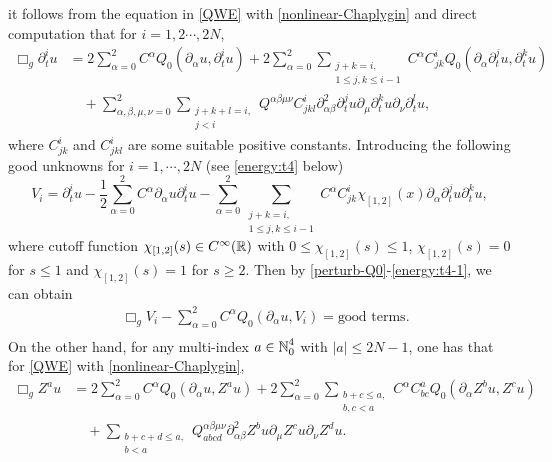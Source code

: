 \documentclass[11pt,twoside]{article}
\def\N{\mathop{\mathbb N\kern 0pt}\nolimits}
\def\R{\mathop{\mathbb R\kern 0pt}\nolimits}
\def\p{\partial}
\theoremstyle{plain}
\theoremstyle{definition}
\numberwithin{equation}{section}
\begin{document}
it follows from the equation in \eqref{QWE} with \eqref{nonlinear-Chaplygin}
and direct computation that for $i=1,2\cdots,2N$,
\begin{equation}\label{energy:t3-1}
\begin{split}
\Box_g\p_t^iu&=2\sum_{\alpha=0}^2C^{\alpha}Q_0(\p_{\alpha}u,\p_t^iu)
+2\sum_{\alpha=0}^2\sum_{\substack{j+k=i,\\1\le j,k\le i-1}}C^{\alpha}C^i_{jk}Q_0(\p_{\alpha}\p_t^ju,\p_t^ku)\\
&\quad+\sum_{\alpha,\beta,\mu,\nu=0}^2\sum_{\substack{j+k+l=i,\\ j<i}}Q^{\alpha\beta\mu\nu}C^i_{jkl}\p^2_{\alpha\beta}\p_t^ju\p_{\mu}\p_t^ku\p_{\nu}\p_t^lu,
\end{split}
\end{equation}
where $C^i_{jk}$ and $C^i_{jkl}$ are some suitable positive constants.
Introducing the following good unknowns for $i=1,\cdots,2N$ (see \eqref{energy:t4} below)
\begin{equation}\label{energy:t4-1}
V_i=\p_t^iu-\frac12\sum_{\alpha=0}^2C^{\alpha}\p_{\alpha}u\p_t^iu
-\sum_{\alpha=0}^2\sum_{\substack{j+k=i,\\1\le j,k\le i-1}}C^{\alpha}C^i_{jk}\chi_{[1,2]}(x)\p_{\alpha}\p_t^ju\p_t^ku,
\end{equation}
where cutoff function $\chi_{[1,2]}(s)\in C^\infty(\R)$ with $0\le\chi_{[1,2]}(s)\le1$,
$\chi_{[1,2]}(s)=0$ for $s\le 1$ and $\chi_{[1,2]}(s)=1$ for $s\ge 2$.
Then by \eqref{perturb-Q0}-\eqref{energy:t4-1}, we can obtain
\begin{equation}\label{energy:t5-1-0}
\begin{split}
&\Box_gV_i-\sum_{\alpha=0}^2C^{\alpha}Q_0(\p_{\alpha}u,V_i)
=\text{good terms}.\\
\end{split}
\end{equation}
On the other hand, for any multi-index $a\in\N_0^4$ with $|a|\le2N-1$, one has that
for \eqref{QWE} with \eqref{nonlinear-Chaplygin},
\begin{equation}\label{energyA1-1}
\begin{split}
\Box_gZ^au&=2\sum_{\alpha=0}^2C^{\alpha}Q_0(\p_{\alpha}u,Z^au)
+2\sum_{\alpha=0}^2\sum_{\substack{b+c\le a,\\b,c<a}}C^{\alpha}C^a_{bc}Q_0(\p_{\alpha}Z^bu,Z^cu)\\
&\quad+\sum_{\substack{b+c+d\le a,\\b<a}}Q_{abcd}^{\alpha\beta\mu\nu}\p^2_{\alpha\beta}Z^bu\p_{\mu}Z^cu\p_{\nu}Z^du.
\end{split}
\end{equation}
\end{document}
